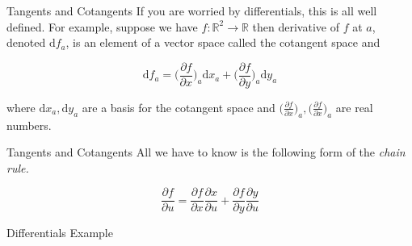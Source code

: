 \documentclass{beamer}
\begin{document}
\begin{frame}[fragile]{Tangents and Cotangents}
  If you are worried by differentials, this is all well defined. For
  example, suppose we have $f : \mathbb{R}^2 \rightarrow \mathbb{R}$
  then derivative of $f$ at $a$, denoted $\mathrm{d}f_a$, is an
  element of a vector space called the cotangent space and

$$
\mathrm{d}f_a = \bigg(\frac{\partial f}{\partial x}\bigg)_a\mathrm{d}x_a +
                \bigg(\frac{\partial f}{\partial y}\bigg)_a\mathrm{d}y_a
$$

where $\mathrm{d}x_a, \mathrm{d}y_a$ are a basis for the cotangent
space and $\big(\frac{\partial f}{\partial x}\big)_a,
\big(\frac{\partial f}{\partial x}\big)_a$ are real numbers.
\end{frame}

\begin{frame}[fragile]{Tangents and Cotangents}
All we have to know is the following form of the \it{chain rule}.

$$
\frac{\partial f}{\partial u} =
 \frac{\partial f}{\partial x}\frac{\partial x}{\partial u} +
 \frac{\partial f}{\partial y}\frac{\partial y}{\partial u}
$$

\end{frame}

\begin{frame}[fragile]{Differentials Example}
\end{frame}
\end{document}
